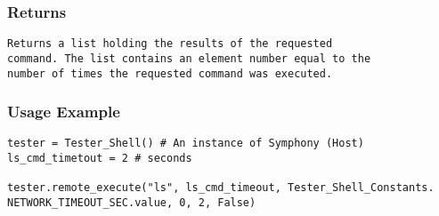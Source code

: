 \subsubsection{Returns}
\begin{lstlisting}[mathescape=true, keywordstyle=\color{black}]
Returns a list holding the results of the requested 
command. The list contains an element number equal to the 
number of times the requested command was executed. 
\end{lstlisting}


\subsubsection{Usage Example}
\begin{lstlisting}
tester = Tester_Shell() # An instance of Symphony (Host)
ls_cmd_timetout = 2 # seconds

tester.remote_execute("ls", ls_cmd_timeout, Tester_Shell_Constants. NETWORK_TIMEOUT_SEC.value, 0, 2, False)

\end{lstlisting}
